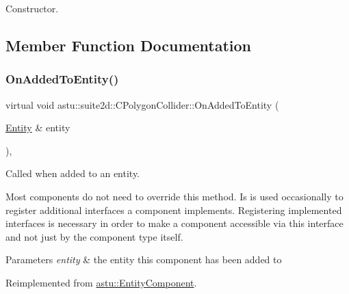 Constructor. 

\subsection{Member Function Documentation}
\mbox{\label{classastu_1_1suite2d_1_1CPolygonCollider_ac30165a676e92f89e1a840f858d9a050}} 
\subsubsection{\texorpdfstring{On\+Added\+To\+Entity()}{OnAddedToEntity()}}
{\footnotesize\ttfamily virtual void astu\+::suite2d\+::\+C\+Polygon\+Collider\+::\+On\+Added\+To\+Entity (\begin{DoxyParamCaption}\item[{\hyperlink{classastu_1_1Entity}{Entity} \&}]{entity }\end{DoxyParamCaption})\hspace{0.3cm}{\ttfamily [inline]}, {\ttfamily [virtual]}}

Called when added to an entity.

Most components do not need to override this method. Is is used occasionally to register additional interfaces a component implements. Registering implemented interfaces is necessary in order to make a component accessible via this interface and not just by the component type itself.


\begin{DoxyParams}{Parameters}
{\em entity} & the entity this component has been added to \\
\hline
\end{DoxyParams}


Reimplemented from \hyperlink{classastu_1_1EntityComponent_a8736f12dc9d2be7d2569408fc1040480}{astu\+::\+Entity\+Component}.

\mbox{\label{classastu_1_1suite2d_1_1CPolygonCollider_ac3f4b3c6885f72270ecde8ec8a8a4ed5}} 
